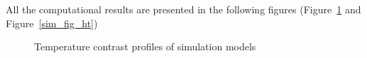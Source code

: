 \documentclass{tQRT2e}
\begin{document}
All the computational results are presented in the following figures (Figure~\ref{sim_fig_stat} and Figure~\ref{sim_fig_ht})
\begin{figure}
    \hspace{-15pt}
	\caption{Temperature contrast profiles of simulation models}
	\label{sim_fig_stat}
\end{figure}
\end{document}
